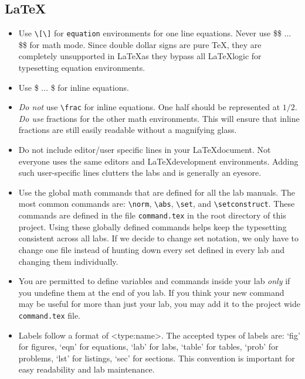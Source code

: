 \subsection{\LaTeX}
\begin{itemize}
\item Use \texttt{\textbackslash{[}\textbackslash{]}} for \texttt{equation} environments for one line equations.  
Never use \$\$ ... \$\$ for math mode.
Since double dollar signs are pure \TeX, they are completely unsupported in \LaTeX as they bypass all \LaTeX logic for typesetting equation environments.
\item Use \$ ... \$ for inline equations.
\item \emph{Do not} use \texttt{\textbackslash{frac}} for inline equations.
One half should be represented at $1/2$.
\emph{Do use} fractions for the other math environments.
This will ensure that inline fractions are still easily readable without a magnifying glass.
\item Do not include editor/user specific lines in your \LaTeX document.
Not everyone uses the same editors and \LaTeX development environments.
Adding such user-specific lines clutters the labs and is generally an eyesore.
\item Use the global math commands that are defined for all the lab manuals.
The most common commands are: \texttt{\textbackslash{norm}}, \texttt{\textbackslash{abs}}, \texttt{\textbackslash{set}}, and \texttt{\textbackslash{setconstruct}}. 
These commands are defined in the file \texttt{command.tex} in the root directory of this project.
Using these globally defined commands helps keep the typesetting consistent across all labs.
If we decide to change set notation, we only have to change one file instead of hunting down every set defined in every lab and changing them individually.
\item You are permitted to define variables and commands inside your lab \emph{only} if you undefine them at the end of you lab.
If you think your new command may be useful for more than just your lab, you may add it to the project wide \texttt{command.tex} file.
\item Labels follow a format of \textless type:name\textgreater.
The accepted types of labels are: `fig' for figures, `eqn' for equations, `lab' for labs, `table' for tables, `prob' for problems, `lst' for listings, `sec' for sections.
This convention is important for easy readability and lab maintenance.
\end{itemize}



